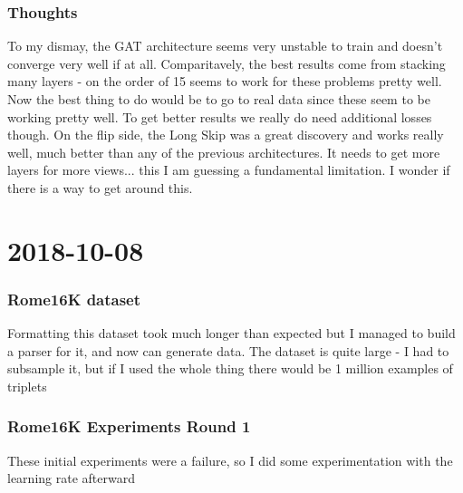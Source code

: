 \documentclass[a4paper]{article}
\newcommand{\DatestampYMD}[3]{\mbox{#1-#2-#3}}
\newcommand{\entry}[3]{\newpage\section*{\DatestampYMD{#1}{#2}{#3}} }
\begin{document}
\subsubsection*{Thoughts}
To my dismay, the GAT architecture seems very unstable to train and doesn't converge very well if at all. Comparitavely, the best results come from stacking many layers - on the order of 15 seems to work for these problems pretty well. Now the best thing to do would be to go to real data since these seem to be working pretty well. To get better results we really do need additional losses though.
On the flip side, the Long Skip was a great discovery and works really well, much better than any of the previous architectures. It needs to get more layers for more views... this I am guessing a fundamental limitation. I wonder if there is a way to get around this.


\entry{2018}{10}{08}
\subsubsection*{Rome16K dataset}
Formatting this dataset took much longer than expected but I managed to build a parser for it, and now can generate data. The dataset is quite large - I had to subsample it, but if I used the whole thing there would be 1 million examples of triplets

\subsubsection*{Rome16K Experiments Round 1}
These initial experiments were a failure, so I did some experimentation with the learning rate afterward
\end{document}
